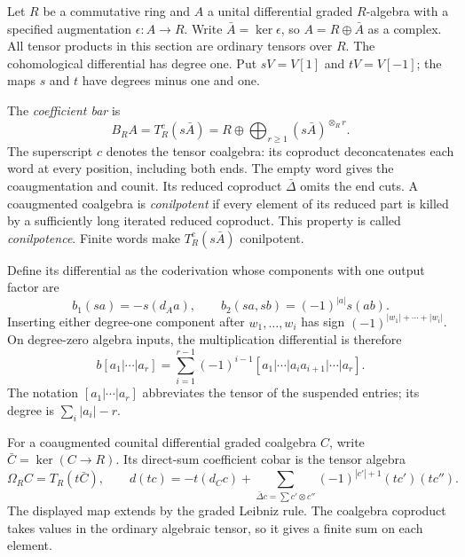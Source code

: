 Let \(R\) be a commutative ring and \(A\) a unital differential
graded \(R\)-algebra with a specified augmentation
\(\epsilon:A\to R\). Write \(\bar A=\ker\epsilon\), so
\(A=R\oplus\bar A\) as a complex. All tensor products in this
section are ordinary tensors over \(R\). The cohomological
differential has degree one. Put \(sV=V[1]\) and \(tV=V[-1]\);
the maps \(s\) and \(t\) have degrees minus one and one.

The \emph{coefficient bar} is
\begin{equation}\label{v4-eq:bar-coefficient}
 B_R A=T_R^c(s\bar A)
       =R\oplus\bigoplus_{r\geq1}(s\bar A)^{\otimes_R r}.
\end{equation}
The superscript \(c\) denotes the tensor coalgebra: its coproduct
deconcatenates each word at every position, including both ends.
The empty word gives the coaugmentation and counit. Its reduced
coproduct \(\bar\Delta\) omits the end cuts. A coaugmented
coalgebra is \emph{conilpotent} if every element of its reduced
part is killed by a sufficiently long iterated reduced coproduct.
This property is called \emph{conilpotence}.
Finite words make \(T_R^c(s\bar A)\) conilpotent.

Define its differential as the coderivation whose components with
one output factor are
\begin{equation}\label{v4-eq:bar-coefficient-signs}
 b_1(sa)=-s(d_Aa),\qquad
 b_2(sa,sb)=(-1)^{|a|}s(ab).
\end{equation}
Inserting either degree-one component after
\(w_1,\ldots,w_i\) has sign
\((-1)^{|w_1|+\cdots+|w_i|}\). On degree-zero algebra inputs,
the multiplication differential is therefore
\[
 b[a_1|\cdots|a_r]
    =\sum_{i=1}^{r-1}(-1)^{i-1}
                 [a_1|\cdots|a_ia_{i+1}|\cdots|a_r].
\]
The notation \([a_1|\cdots|a_r]\) abbreviates the tensor of the
suspended entries; its degree is \(\sum_i|a_i|-r\).

For a coaugmented counital differential graded coalgebra \(C\),
write \(\bar C=\ker(C\to R)\). Its direct-sum coefficient cobar is
the tensor algebra
\begin{equation}\label{v4-eq:bar-coefficient-cobar}
 \Omega_R C=T_R(t\bar C),\qquad
 d(tc)=-t(d_Cc)+
       \sum_{\bar\Delta c=\sum c'\otimes c''}
                    (-1)^{|c'|+1}(tc')(tc'').
\end{equation}
The displayed map extends by the graded Leibniz rule. The
coalgebra coproduct takes values in the ordinary algebraic tensor,
so it gives a finite sum on each element.

